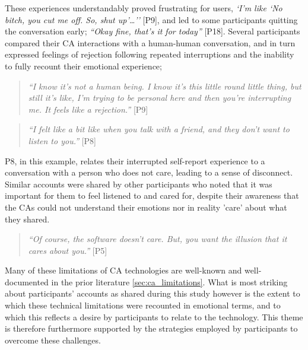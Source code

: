             These experiences understandably proved frustrating for users, \textit{`I'm like `No bitch, you cut me off. So, shut up'\ldots''} [P9], and led to some participants quitting the conversation early; \textit{``Okay fine, that's it for today''} [P18]. Several participants compared their \ac{CA} interactions with a human-human conversation, and in turn expressed feelings of rejection following repeated interruptions and the inability to fully recount their emotional experience;
                
                \begin{quote}
                \vspace{2mm}
                    \textit{``I know it's not a human being. I know it's this little round little thing, but still it's like, I'm trying to be personal here and then you're interrupting me. It feels like a rejection.''} [P9]
                \vspace{2mm}
                \end{quote}
                
                \begin{quote}
                \vspace{2mm}
                    \textit{``I felt like a bit like when you talk with a friend, and they don't want to listen to you.''} [P8]
                \vspace{2mm}
                \end{quote}
                
            P8, in this example, relates their interrupted self-report experience to a conversation with a person who does not care, leading to a sense of disconnect. Similar accounts were shared by other participants who noted that it was important for them to feel listened to and cared for, despite their awareness that the \acp{CA} could not understand their emotions nor in reality 'care' about what they shared.
            
                \begin{quote}
                \vspace{2mm}
                    \textit{``Of course, the software doesn't care. But, you want the illusion that it cares about you.''} [P5]
                \vspace{2mm}
                \end{quote}
            
            Many of these limitations of CA technologies are well-known and well-documented in the prior literature \ref{sec:ca_limitations}. What is most striking about participants' accounts as shared during this study however is the extent to which these technical limitations were recounted in emotional terms, and to which this reflects a desire by participants to relate to the technology. This theme is therefore furthermore supported by the strategies employed by participants to overcome these challenges.
  

